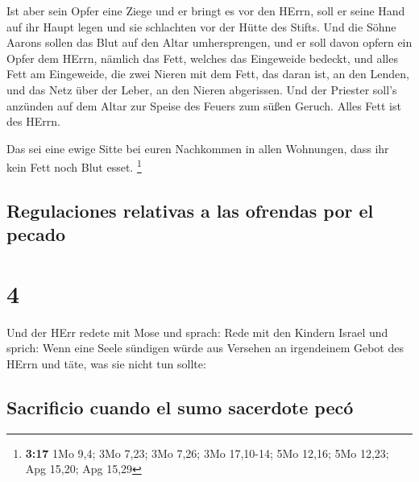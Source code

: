  Ist aber sein Opfer eine Ziege und er bringt es vor den
HErrn,  soll er seine Hand auf ihr Haupt legen und sie
schlachten vor der Hütte des Stifts. Und die Söhne Aarons sollen das
Blut auf den Altar umhersprengen,  und er soll davon
opfern ein Opfer dem HErrn, nämlich das Fett, welches das Eingeweide
bedeckt, und alles Fett am Eingeweide,  die zwei Nieren
mit dem Fett, das daran ist, an den Lenden, und das Netz über der Leber,
an den Nieren abgerissen.  Und der Priester soll's
anzünden auf dem Altar zur Speise des Feuers zum süßen Geruch. Alles
Fett ist des HErrn.

 Das sei eine ewige Sitte bei euren Nachkommen in allen
Wohnungen, dass ihr kein Fett noch Blut esset. \footnote{\textbf{3:17}
  1Mo 9,4; 3Mo 7,23; 3Mo 7,26; 3Mo 17,10-14; 5Mo 12,16; 5Mo 12,23; Apg
  15,20; Apg 15,29}

\hypertarget{regulaciones-relativas-a-las-ofrendas-por-el-pecado}{%
\subsection{Regulaciones relativas a las ofrendas por el
pecado}\label{regulaciones-relativas-a-las-ofrendas-por-el-pecado}}

\hypertarget{section-3}{%
\section{4}\label{section-3}}

 Und der HErr redete mit Mose und sprach: 
Rede mit den Kindern Israel und sprich: Wenn eine Seele sündigen würde
aus Versehen an irgendeinem Gebot des HErrn und täte, was sie nicht tun
sollte:

\hypertarget{sacrificio-cuando-el-sumo-sacerdote-pecuxf3}{%
\subsection{Sacrificio cuando el sumo sacerdote
pecó}\label{sacrificio-cuando-el-sumo-sacerdote-pecuxf3}}


